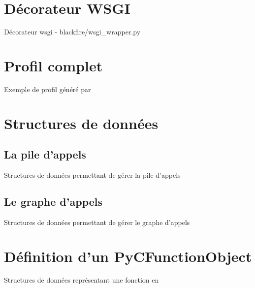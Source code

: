 

\chapter{Décorateur WSGI}
  \label{app:decorateurwsgi}
  \begin{listing}[H]
    \caption{Décorateur wsgi - blackfire/wsgi\_wrapper.py}
  \end{listing}
 
\chapter{Profil complet}
  \label{app:fullProfile}
  \begin{listing}[H]
    \caption{Exemple de profil généré par \Blackfire}
  \end{listing}
 
\chapter{Structures de données}
  \section{La pile d'appels}
    \label{app:pile_struct}
    \begin{listing}[H]
      \caption{Structures de données permettant de gérer la pile d'appels}
    \end{listing}
  \section{Le graphe d'appels}
    \label{app:graph_struct}
    \begin{listing}[H]
      \caption{Structures de données permettant de gérer le graphe d'appels}
    \end{listing}
 
\chapter{Définition d'un PyCFunctionObject}
  \label{app:PyCFunctionObject}
  \begin{listing}[H]
    \caption{Structures de données représentant une fonction \C en \Python}
  \end{listing}
 
